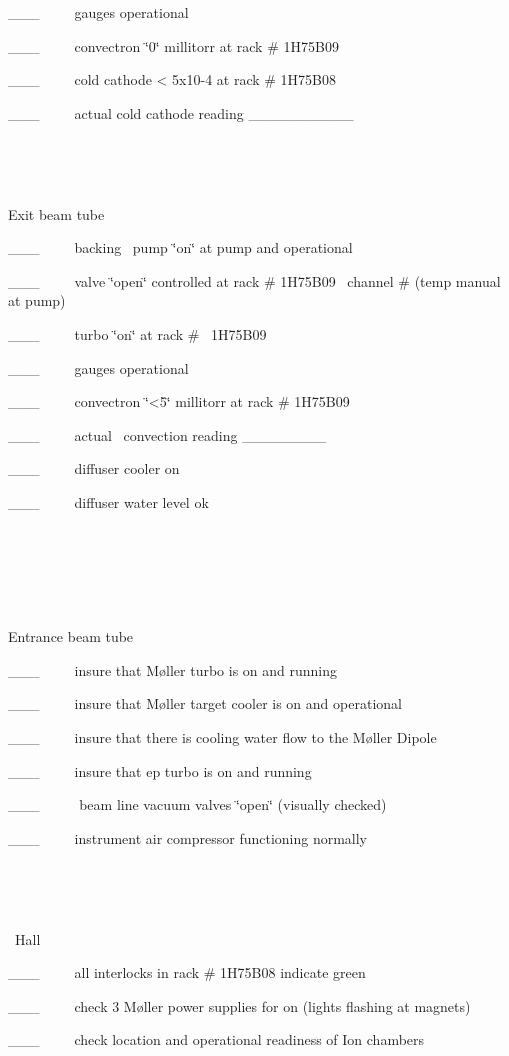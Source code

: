 \_\_\_~~~~~gauges operational

\_\_\_~~~~~convectron \char`\"{}0\char`\"{} millitorr at rack \# 1H75B09

\_\_\_~~~~~cold cathode < 5x10-4 at rack \# 1H75B08

\_\_\_~~~~~actual cold cathode reading \_\_\_\_\_\_\_\_\_\_

~

~

Exit beam tube

\_\_\_~~~~~backing~ pump \char`\"{}on\char`\"{} at pump and operational

\_\_\_~~~~~valve \char`\"{}open\char`\"{} controlled at rack \# 1H75B09~ channel
\# (temp manual at pump)

\_\_\_~~~~~turbo \char`\"{}on\char`\"{} at rack \#~ 1H75B09~~~~~~~~~~~ 

\_\_\_~~~~~gauges operational

\_\_\_~~~~~convectron \char`\"{}<5\char`\"{} millitorr at rack \# 1H75B09

\_\_\_~~~~~actual~ convection reading \_\_\_\_\_\_\_\_

\_\_\_~~~~~diffuser cooler on

\_\_\_~~~~~diffuser water level ok

~

~


~

Entrance beam tube

\_\_\_~~~~~insure that M{\o}ller turbo is on and running

\_\_\_~~~~~insure that M{\o}ller target cooler is on and operational

\_\_\_~~~~~insure that there is cooling water flow to the M{\o}ller Dipole 

\_\_\_~~~~~insure that ep turbo is on and running

\_\_\_~~~~~ beam line vacuum valves \char`\"{}open\char`\"{} (visually checked)

\_\_\_~~~~~instrument air compressor functioning normally

~

~

~Hall 

\_\_\_~~~~~all interlocks in rack \# 1H75B08 indicate green

\_\_\_~~~~~check 3 M{\o}ller power supplies for on (lights flashing at magnets)

\_\_\_~~~~~check location and operational readiness of Ion chambers

